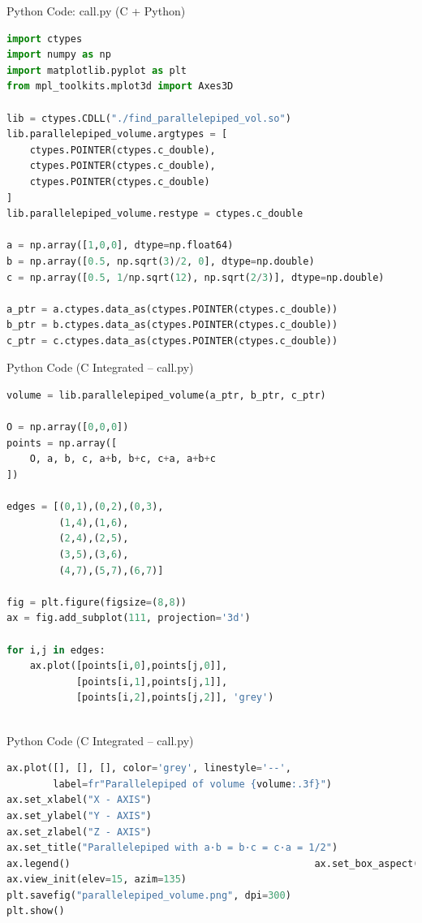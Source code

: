 \documentclass{beamer}
\begin{document}
\begin{frame}[fragile]{Python Code: call.py (C + Python)}
\begin{lstlisting}[language=Python]
import ctypes
import numpy as np
import matplotlib.pyplot as plt
from mpl_toolkits.mplot3d import Axes3D

lib = ctypes.CDLL("./find_parallelepiped_vol.so")
lib.parallelepiped_volume.argtypes = [
    ctypes.POINTER(ctypes.c_double),
    ctypes.POINTER(ctypes.c_double),
    ctypes.POINTER(ctypes.c_double)
]
lib.parallelepiped_volume.restype = ctypes.c_double

a = np.array([1,0,0], dtype=np.float64)
b = np.array([0.5, np.sqrt(3)/2, 0], dtype=np.double)
c = np.array([0.5, 1/np.sqrt(12), np.sqrt(2/3)], dtype=np.double)

a_ptr = a.ctypes.data_as(ctypes.POINTER(ctypes.c_double))
b_ptr = b.ctypes.data_as(ctypes.POINTER(ctypes.c_double))
c_ptr = c.ctypes.data_as(ctypes.POINTER(ctypes.c_double))
\end{lstlisting}
\end{frame}

\begin{frame}[fragile]{Python Code (C Integrated – call.py)
}
\begin{lstlisting}[language=Python]
volume = lib.parallelepiped_volume(a_ptr, b_ptr, c_ptr)

O = np.array([0,0,0])
points = np.array([
    O, a, b, c, a+b, b+c, c+a, a+b+c
])

edges = [(0,1),(0,2),(0,3),
         (1,4),(1,6),
         (2,4),(2,5),
         (3,5),(3,6),
         (4,7),(5,7),(6,7)]

fig = plt.figure(figsize=(8,8))
ax = fig.add_subplot(111, projection='3d')

for i,j in edges:
    ax.plot([points[i,0],points[j,0]],
            [points[i,1],points[j,1]],
            [points[i,2],points[j,2]], 'grey')
            
\end{lstlisting}
\end{frame}

\begin{frame}[fragile]{Python Code (C Integrated – call.py)
}
\begin{lstlisting}[language=Python]
ax.plot([], [], [], color='grey', linestyle='--',
        label=fr"Parallelepiped of volume {volume:.3f}")
ax.set_xlabel("X - AXIS")
ax.set_ylabel("Y - AXIS")
ax.set_zlabel("Z - AXIS")
ax.set_title("Parallelepiped with a·b = b·c = c·a = 1/2")
ax.legend()                                          ax.set_box_aspect([1,1,1])
ax.view_init(elev=15, azim=135)                      
plt.savefig("parallelepiped_volume.png", dpi=300)
plt.show()
\end{lstlisting}
\end{frame}
\end{document}
